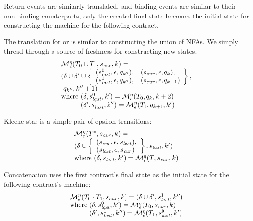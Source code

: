 \documentclass[preprint,onecolumn,9pt]{sigplanconf} %
\begin{document}
Return events are similarly translated, and binding events are similar to their non-binding counterparts, only the created final state becomes the initial state for constructing the machine for the following contract.

The translation for or is similar to constructing the union of NFAs.
%
We simply thread through a source of freshness for constructing new states.
%
\begin{align*}
  \begin{array}{l}
  \epshelp^\mtimeline(\stOr{\mtcon_0}{\mtcon_1}, \pmsmqcur, k) = \\
    (\delta\cup \delta' \cup
    \left\{\begin{array}{ll}
        (\pmsmqlast^0, \epsilon, \pmsmq_{k''}),&
        (\pmsmqcur, \epsilon, \pmsmq_k),\\
        (\pmsmqlast^1, \epsilon, \pmsmq_{k''}),&
        (\pmsmqcur, \epsilon, \pmsmq_{k+1})
      \end{array}\right\},
    \\
    \ \pmsmq_{k''}, k''+ 1)
    \\
    \text{where } (\delta, \pmsmqlast^0, k') = \epshelp^\mtimeline(\mtcon_0, \pmsmq_k, k+2) \\
    \phantom{\text{where }} (\delta', \pmsmqlast^1, k'') = \epshelp^\mtimeline(\mtcon_1, \pmsmq_{k+1}, k')
  \end{array}
\end{align*}

Kleene star is a simple pair of epsilon transitions:
\begin{align*}
  \begin{array}{l}
  {\mathcal M}_\epsilon^\eta(T^*, s_\mathit{cur}, k) = \\
  (\delta \cup \left\{
    \begin{array}{l}
      (s_\mathit{cur}, \epsilon, s_\mathit{last}), \\
      (s_\mathit{last}, \epsilon, s_\mathit{cur})
    \end{array}\right\},
  s_\mathit{last}, k')
 \\ \text{where } (\delta, s_\mathit{last}, k') = {\mathcal M}_\epsilon^\eta(T, s_\mathit{cur}, k)
\end{array}
\end{align*}

Concatenation uses the first contract's final state as the initial state for the following contract's machine:
\begin{align*}
  \begin{array}{l}
    \epshelp^\mtimeline(\stseq{\mtcon_0}{\mtcon_1}, \pmsmqcur, k) = 
     (\delta \cup \delta', \pmsmqlast^1, k'')
   \\ \text{where } (\delta, \pmsmqlast^0, k') = \epshelp^\mtimeline(\mtcon_0, \pmsmqcur, k)
   \\\phantom{\text{where }} (\delta', \pmsmqlast^1, k'') = \epshelp^\mtimeline(\mtcon_1, \pmsmqlast^0, k')
  \end{array}
\end{align*}
%
\end{document}

